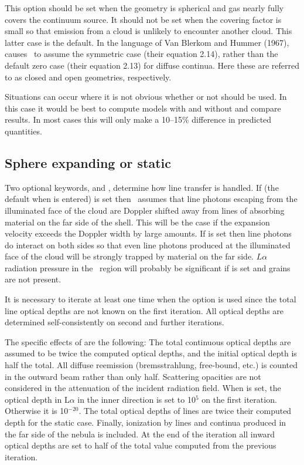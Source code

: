 This option should be set when the geometry is spherical and gas nearly
fully covers the continuum source.
It should not be set when the covering
factor is small so that emission from a cloud is unlikely to encounter
another cloud.
This latter case is the default.
In the language of Van
Blerkom and Hummer (1967), 
causes \Cloudy\ to assume the symmetric
case (their equation 2.14),
rather than the default zero case (their equation
2.13) for diffuse continua.
Here these are referred to as closed and open
geometries, respectively.

Situations can occur where it is not obvious whether or not
 should
be used.
In this case it would be best to compute models with and without
 and compare results.
In most cases this will only make a 10--15\%
difference in predicted quantities.

\subsection{Sphere expanding or static}

Two optional keywords,
 and ,
determine how line transfer
is handled.
If  (the default when
 is entered) is set then
\Cloudy\ assumes that line photons escaping
from the illuminated face of the
cloud are Doppler shifted away from lines of
absorbing material on the far
side of the shell.
This will be the case if the expansion velocity exceeds
the Doppler width by large amounts.
If  is set then line photons
do interact on both sides so that even line photons produced at the
illuminated face of the cloud will be strongly trapped by material on the
far side.
$L\alpha $ radiation pressure in the \hplus\ region will probably be
significant if  is set and grains are not present.

It is necessary to iterate at least one time when
the  option is
used since the total line optical depths are not known on the first
iteration.
All optical depths are determined self-consistently on second
and further iterations.

The specific effects of  are the following:
The total continuous
optical depths are assumed to be twice the computed optical depths, and
the initial optical depth is half the total.
All diffuse reemission
(bremsstrahlung, free-bound, etc.) is counted in the outward beam
rather than only half.
Scattering opacities are not considered in the attenuation
of the incident radiation field.
When  is set, the optical depth
in L$\alpha$ in the inner direction is set to 10$^5$ on the first iteration.
Otherwise it is 10$^{-20}$.
The total optical depths of lines are twice their computed
depth for the static case.
Finally, ionization by lines and continua
produced in the far side of the nebula is included.
At the end of the
iteration all inward optical depths are set to half of the total value
computed from the previous iteration.

